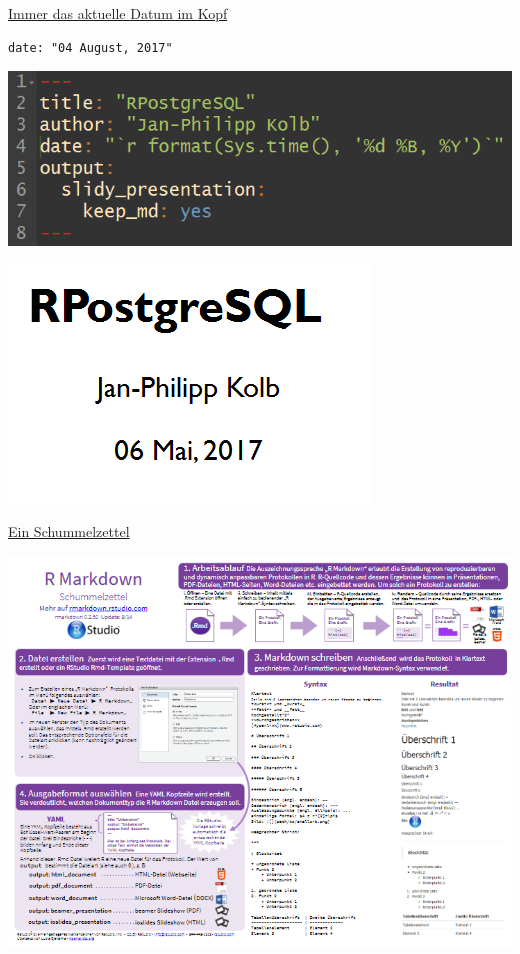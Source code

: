 \documentclass[ignorenonframetext,]{beamer}
\begin{document}
\begin{frame}[fragile]{\href{http://stackoverflow.com/questions/23449319/yaml-current-date-in-rmarkdown}{Immer
das aktuelle Datum im Kopf}}

\begin{verbatim}
date: "04 August, 2017"
\end{verbatim}

\includegraphics{./tex2pdf.956/ebadc2d71c01832b420043fed3246d42cb890263.png}

\includegraphics{./tex2pdf.956/d0c85ca1742e1c3f37b4ed04abbb439f0b11ee08.png}

\end{frame}

\begin{frame}{\href{https://www.rstudio.com/wp-content/uploads/2015/06/rmarkdown-german.pdf}{Ein
Schummelzettel}}

\includegraphics{./tex2pdf.956/dd7920db4654ba118987d112b41c661a5cc57a14.png}

\end{frame}
\end{document}
